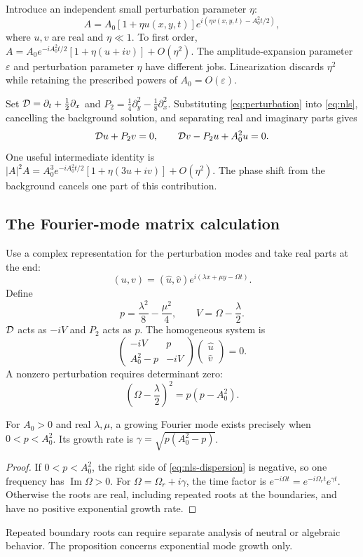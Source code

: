 Introduce an independent small perturbation parameter $\eta$:
\begin{equation}\label{eq:perturbation}
 A=A_0[1+\eta u(x,y,t)]
       e^{i(\eta v(x,y,t)-A_0^2t/2)},
\end{equation}
where $u,v$ are real and $\eta\ll1$. To first order,
$A=A_0e^{-iA_0^2t/2}[1+\eta(u+iv)]+O(\eta^2)$.
The amplitude-expansion parameter $\varepsilon$ and perturbation parameter
$\eta$ have different jobs. Linearization discards $\eta^2$ while retaining
the prescribed powers of $A_0=O(\varepsilon)$.

Set $\mathcal{D}=\partial_t+\tfrac12\partial_x$ and
$P_2=\tfrac14\partial_y^2-\tfrac18\partial_x^2$.
Substituting \eqref{eq:perturbation} into \eqref{eq:nls}, cancelling the
background solution, and separating real and imaginary parts gives
\begin{equation}\label{eq:nls-linear}
 \mathcal{D} u+P_2v=0,\qquad
 \mathcal{D} v-P_2u+A_0^2u=0.
\end{equation}
One useful intermediate identity is
$|A|^2A=A_0^3e^{-iA_0^2t/2}[1+\eta(3u+iv)]+O(\eta^2)$.
The phase shift from the background cancels one part of this contribution.

\subsection{The Fourier-mode matrix calculation}
Use a complex representation for the perturbation modes and take real
parts at the end:
\[
 (u,v)=(\widehat u,\widehat v)e^{i(\lambda x+\mu y-\Omega t)}.
\]
Define
\[
 p=\frac{\lambda^2}{8}-\frac{\mu^2}{4},\qquad
 V=\Omega-\frac\lambda2.
\]
$\mathcal{D}$ acts as $-iV$ and $P_2$ acts as $p$. The homogeneous system is
\[
 \begin{pmatrix}-iV&p\\A_0^2-p&-iV\end{pmatrix}
 \begin{pmatrix}\widehat u\\\widehat v\end{pmatrix}=0.
\]
A nonzero perturbation requires determinant zero:
\begin{equation}\label{eq:nls-dispersion}
 \left(\Omega-\frac\lambda2\right)^2=p(p-A_0^2).
\end{equation}

\begin{proposition}
For $A_0>0$ and real $\lambda,\mu$, a growing Fourier mode exists precisely
when $0<p<A_0^2$. Its growth rate is
$\gamma=\sqrt{p(A_0^2-p)}$.
\end{proposition}
\begin{proof}
If $0<p<A_0^2$, the right side of \eqref{eq:nls-dispersion} is negative,
so one frequency has $\operatorname{Im}\Omega>0$. For
$\Omega=\Omega_r+i\gamma$, the time factor is
$e^{-i\Omega t}=e^{-i\Omega_rt}e^{\gamma t}$. Otherwise the roots are
real, including repeated roots at the boundaries, and have no positive
exponential growth rate.\qedhere
\end{proof}
Repeated boundary roots can require separate analysis of neutral or
algebraic behavior. The proposition concerns exponential mode growth only.


